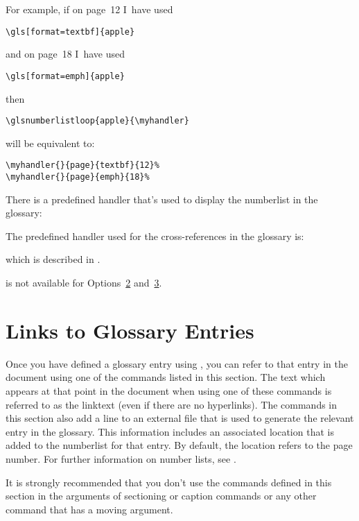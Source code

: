 \documentclass[report,inlinetitle]{nlctdoc}
\newcommand*{\optsand}[2]{Options~\hyperlink{option#1}{#1}
and~\hyperlink{option#2}{#2}}
\begin{document}
For example, if on page~12
I~have used
\begin{verbatim}
\gls[format=textbf]{apple}
\end{verbatim}
and on page~18 I~have used
\begin{verbatim}
\gls[format=emph]{apple}
\end{verbatim}
then
\begin{verbatim}
\glsnumberlistloop{apple}{\myhandler}
\end{verbatim}
will be equivalent to:
\begin{verbatim}
\myhandler{}{page}{textbf}{12}%
\myhandler{}{page}{emph}{18}%
\end{verbatim}
There is a predefined handler that's used to display the
\gls{numberlist} in the glossary:
\begin{definition}[\DescribeMacro\glsnoidxdisplayloc]
\end{definition}
The predefined handler used for the cross-references in the glossary is:
\begin{definition}
\end{definition}
which is described in .

\begin{important}
 is not available for \optsand23.
\end{important}

\chapter{Links to Glossary Entries}
\label{sec:glslink}

Once you have defined a glossary entry using ,
you can refer to that entry in the document using one of the
commands listed in this section. The text which appears at that
point in the document when using one of these commands is referred
to as the \gls{linktext} (even if there are no hyperlinks). The
commands in this section also add a line to an external file that is
used to generate the relevant entry in the glossary. This
information includes an associated location that is added to the
\gls{numberlist} for that entry. By default, the location refers to
the page number. For further information on number lists, see
.

\begin{important}
It is strongly recommended that you don't use the commands
defined in this section in the arguments of sectioning or caption
commands or any other command that has a moving argument.
\end{important}
\end{document}
